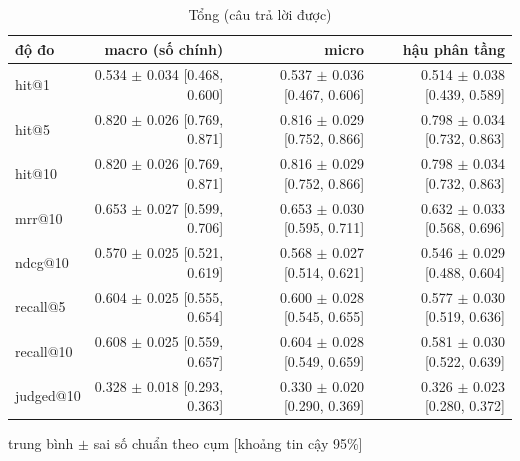 
\begin{table}[ht]
\centering
\caption{Tổng (câu trả lời được)}
\begin{tabular}{lrrr}
\toprule
độ đo & macro (số chính) & micro & hậu phân tầng \\
\midrule
hit@1 & 0.534 $\pm$ 0.034 [0.468, 0.600] & 0.537 $\pm$ 0.036 [0.467, 0.606] & 0.514 $\pm$ 0.038 [0.439, 0.589] \\
hit@5 & 0.820 $\pm$ 0.026 [0.769, 0.871] & 0.816 $\pm$ 0.029 [0.752, 0.866] & 0.798 $\pm$ 0.034 [0.732, 0.863] \\
hit@10 & 0.820 $\pm$ 0.026 [0.769, 0.871] & 0.816 $\pm$ 0.029 [0.752, 0.866] & 0.798 $\pm$ 0.034 [0.732, 0.863] \\
mrr@10 & 0.653 $\pm$ 0.027 [0.599, 0.706] & 0.653 $\pm$ 0.030 [0.595, 0.711] & 0.632 $\pm$ 0.033 [0.568, 0.696] \\
ndcg@10 & 0.570 $\pm$ 0.025 [0.521, 0.619] & 0.568 $\pm$ 0.027 [0.514, 0.621] & 0.546 $\pm$ 0.029 [0.488, 0.604] \\
recall@5 & 0.604 $\pm$ 0.025 [0.555, 0.654] & 0.600 $\pm$ 0.028 [0.545, 0.655] & 0.577 $\pm$ 0.030 [0.519, 0.636] \\
recall@10 & 0.608 $\pm$ 0.025 [0.559, 0.657] & 0.604 $\pm$ 0.028 [0.549, 0.659] & 0.581 $\pm$ 0.030 [0.522, 0.639] \\
judged@10 & 0.328 $\pm$ 0.018 [0.293, 0.363] & 0.330 $\pm$ 0.020 [0.290, 0.369] & 0.326 $\pm$ 0.023 [0.280, 0.372] \\
\bottomrule
\end{tabular}
\par\smallskip\footnotesize trung bình $\pm$ sai số chuẩn theo cụm [khoảng tin cậy 95\%]
\end{table}


